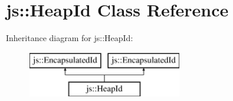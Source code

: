 \hypertarget{classjs_1_1_heap_id}{\section{js\-:\-:Heap\-Id Class Reference}
\label{classjs_1_1_heap_id}
}
Inheritance diagram for js\-:\-:Heap\-Id\-:\begin{figure}[H]
\begin{center}
\leavevmode
\includegraphics[height=2.000000cm]{classjs_1_1_heap_id}
\end{center}
\end{figure}
